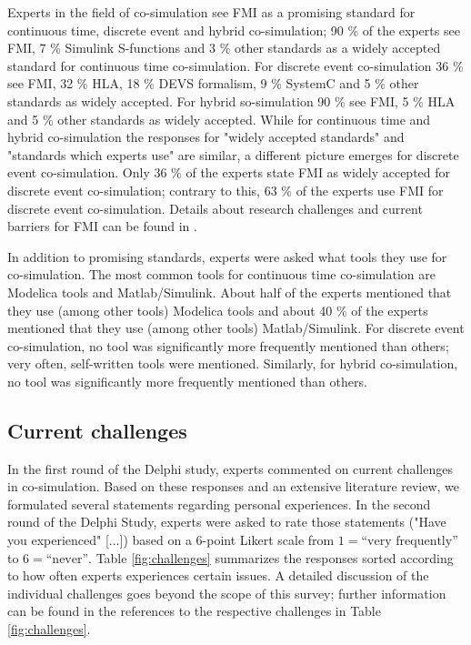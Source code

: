 Experts in the field of co-simulation see FMI as a promising standard for continuous time, discrete event and hybrid co-simulation;  90 \% of the experts see FMI, 7 \% Simulink S-functions and 3 \% other standards as a widely accepted standard for continuous time co-simulation. 
For discrete event co-simulation  36 \% see FMI, 32 \% HLA, 18 \% DEVS formalism, 9 \% SystemC and 5 \% other standards as widely accepted. 
For hybrid so-simulation  90 \% see FMI, 5 \% HLA  and 5 \%  other standards as widely accepted. 
While for continuous time and hybrid co-simulation the responses for "widely accepted standards" and "standards which experts use" are similar, a different picture emerges for discrete event co-simulation. 
Only 36 \% of the experts state FMI as widely accepted for discrete event co-simulation; contrary to this, 63 \% of the experts use FMI for discrete event co-simulation. 
Details about research challenges and current barriers for FMI can be found in \cite{Schweiger2018b}.

In addition to promising standards, experts were asked what tools they use for co-simulation. The most common tools for continuous time co-simulation are Modelica tools and Matlab/Simulink. 
About half of the experts mentioned that they use (among other tools)  Modelica tools and about 40 \% of the experts mentioned that they use (among other tools) Matlab/Simulink. 
For discrete event co-simulation, no tool was significantly more frequently mentioned than others; very often, self-written tools were mentioned. 
Similarly, for hybrid co-simulation, no tool was significantly more frequently mentioned than others.



\subsection{Current challenges}
In the first round of the Delphi study, experts commented on current challenges in co-simulation. 
Based on these responses and an extensive literature review, we formulated several statements regarding personal experiences. 
In the second round of the Delphi Study, experts were asked to rate those statements ("Have you experienced" [...]) based on a 6-point Likert scale from $1 = \text{``very frequently''}$ to $6 = \text{``never''}$. 
Table \ref{fig:challenges} summarizes the responses sorted according to how often experts experiences certain issues. 
A detailed discussion of the individual challenges goes beyond the scope of this survey; further information can be found in the references to the respective challenges in Table \ref{fig:challenges}.


